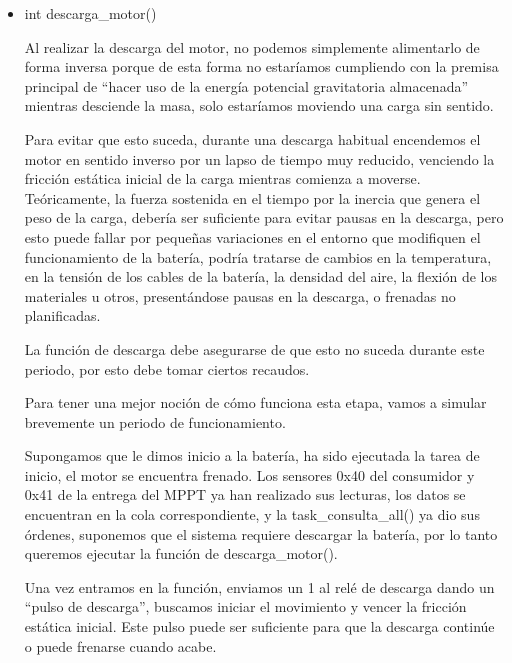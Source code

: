                  \begin{itemize} [label = ·]
                \setlength{\itemindent}{1.5em}
                
                     \item int descarga\_motor()\par
                        Al realizar la descarga del motor, no podemos simplemente alimentarlo de forma inversa porque de esta forma no estaríamos cumpliendo con la premisa principal de “hacer uso de la energía potencial gravitatoria almacenada” mientras desciende la masa, solo estaríamos moviendo una carga sin sentido.\par
                        Para evitar que esto suceda, durante una descarga habitual encendemos el motor en sentido inverso por un lapso de tiempo muy reducido, venciendo la fricción estática inicial de la carga mientras comienza a moverse.
                        Teóricamente, la fuerza sostenida en el tiempo por la inercia que genera el peso de la carga, debería ser suficiente para evitar pausas en la descarga, pero esto puede fallar por pequeñas variaciones en el entorno que modifiquen el funcionamiento de la batería, podría tratarse de cambios en la temperatura, en la tensión de los cables de la batería, la densidad del aire, la flexión de los materiales u otros, presentándose pausas en la descarga, o frenadas no planificadas.\par
                        La función de descarga debe asegurarse de que esto no suceda durante este periodo, por esto debe tomar ciertos recaudos.\par
                        Para tener una mejor noción de cómo funciona esta etapa, vamos a simular brevemente un periodo de funcionamiento.\par
                        Supongamos que le dimos inicio a la batería, ha sido ejecutada la tarea de inicio, el motor se encuentra frenado. Los sensores 0x40 del consumidor y 0x41 de la entrega del MPPT ya han realizado sus lecturas, los datos se encuentran en la cola correspondiente, y la task\_consulta\_all() ya dio sus órdenes, suponemos que el sistema requiere descargar la batería, por lo tanto queremos ejecutar la función de descarga\_motor().\par
                        Una vez entramos en la función, enviamos un 1 al relé de descarga dando un “pulso de descarga”, buscamos iniciar el movimiento y vencer la fricción estática inicial. Este pulso puede ser suficiente para que la descarga continúe o puede frenarse cuando acabe.\par

\end{itemize}

